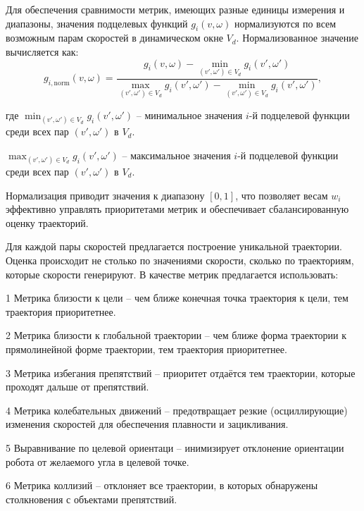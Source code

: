 Для обеспечения сравнимости метрик,
имеющих разные единицы измерения и диапазоны,
значения подцелевых функций $g_i(v, \omega)$ нормализуются по всем возможным парам скоростей 
в динамическом окне $V_d$.
Нормализованное значение вычисляется как:
\begin{equation}
	g_{i, \text{norm}}(v, \omega) = \frac{g_i(v, \omega) - \min_{(v', \omega') \in V_d} g_i(v', \omega')}{\max_{(v', \omega') \in V_d} g_i(v', \omega') - \min_{(v', \omega') \in V_d} g_i(v', \omega')},
\end{equation}

\begin{explanationx}
	\item[где] $\min_{(v', \omega') \in V_d} g_i(v', \omega')$ --
минимальное значения $i$-й подцелевой функции среди всех пар $(v', \omega')$ в $V_d$.
	\item $\max_{(v', \omega') \in V_d} g_i(v', \omega')$ --
максимальное значения $i$-й подцелевой функции среди всех пар $(v', \omega')$ в $V_d$.
\end{explanationx}

Нормализация приводит значения к диапазону $[0, 1]$, что позволяет весам $w_i$ эффективно управлять
приоритетами метрик и обеспечивает сбалансированную оценку траекторий.

Для каждой пары скоростей предлагается построение уникальной траектории.
Оценка происходит не столько по значениями скорости, сколько по траекториям, которые скорости генерируют.
В качестве метрик предлагается использовать:

    1 Метрика близости к цели -- чем ближе конечная точка траектория к цели, тем траектория приоритетнее.

    2 Метрика близости к глобальной траектории -- чем ближе форма траектории к прямолинейной форме траектории, тем траектория приоритетнее.  

    3 Метрика избегания препятствий -- приоритет отдаётся тем траектории, которые проходят дальше от препятствий.

    4 Метрика колебательных движений -- предотвращает резкие (осциллирующие) изменения скоростей для обеспечения плавности и зацикливания.

    5 Выравнивание по целевой ориентаци -- инимизирует отклонение ориентации робота от желаемого угла в целевой точке.

    6 Метрика коллизий -- отклоняет все траектории, в которых обнаружены столкновения с объектами препятствий.


